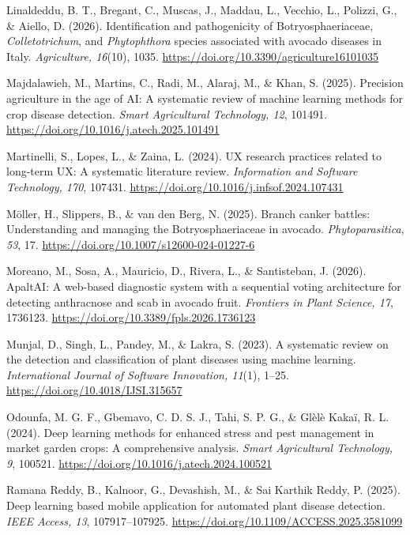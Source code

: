 \documentclass[11pt]{article}
\newcommand{\referencia}[1]{{\RaggedRight\hangindent=1.27cm\hangafter=1 #1\par}\vspace{-2pt}}
\begin{document}
\referencia{Linaldeddu, B. T., Bregant, C., Muscas, J., Maddau, L., Vecchio, L., Polizzi, G., \& Aiello, D. (2026). Identification and pathogenicity of Botryosphaeriaceae, \textit{Colletotrichum}, and \textit{Phytophthora} species associated with avocado diseases in Italy. \textit{Agriculture, 16}(10), 1035. \url{https://doi.org/10.3390/agriculture16101035}}

\referencia{Majdalawieh, M., Martins, C., Radi, M., Alaraj, M., \& Khan, S. (2025). Precision agriculture in the age of AI: A systematic review of machine learning methods for crop disease detection. \textit{Smart Agricultural Technology, 12}, 101491. \url{https://doi.org/10.1016/j.atech.2025.101491}}

\referencia{Martinelli, S., Lopes, L., \& Zaina, L. (2024). UX research practices related to long-term UX: A systematic literature review. \textit{Information and Software Technology, 170}, 107431. \url{https://doi.org/10.1016/j.infsof.2024.107431}}

\referencia{Möller, H., Slippers, B., \& van den Berg, N. (2025). Branch canker battles: Understanding and managing the Botryosphaeriaceae in avocado. \textit{Phytoparasitica, 53}, 17. \url{https://doi.org/10.1007/s12600-024-01227-6}}

\referencia{Moreano, M., Sosa, A., Mauricio, D., Rivera, L., \& Santisteban, J. (2026). ApaltAI: A web-based diagnostic system with a sequential voting architecture for detecting anthracnose and scab in avocado fruit. \textit{Frontiers in Plant Science, 17}, 1736123. \url{https://doi.org/10.3389/fpls.2026.1736123}}

\referencia{Munjal, D., Singh, L., Pandey, M., \& Lakra, S. (2023). A systematic review on the detection and classification of plant diseases using machine learning. \textit{International Journal of Software Innovation, 11}(1), 1–25. \url{https://doi.org/10.4018/IJSI.315657}}

\referencia{Odounfa, M. G. F., Gbemavo, C. D. S. J., Tahi, S. P. G., \& Glèlè Kakaï, R. L. (2024). Deep learning methods for enhanced stress and pest management in market garden crops: A comprehensive analysis. \textit{Smart Agricultural Technology, 9}, 100521. \url{https://doi.org/10.1016/j.atech.2024.100521}}

\referencia{Ramana Reddy, B., Kalnoor, G., Devashish, M., \& Sai Karthik Reddy, P. (2025). Deep learning based mobile application for automated plant disease detection. \textit{IEEE Access, 13}, 107917–107925. \url{https://doi.org/10.1109/ACCESS.2025.3581099}}
\end{document}
